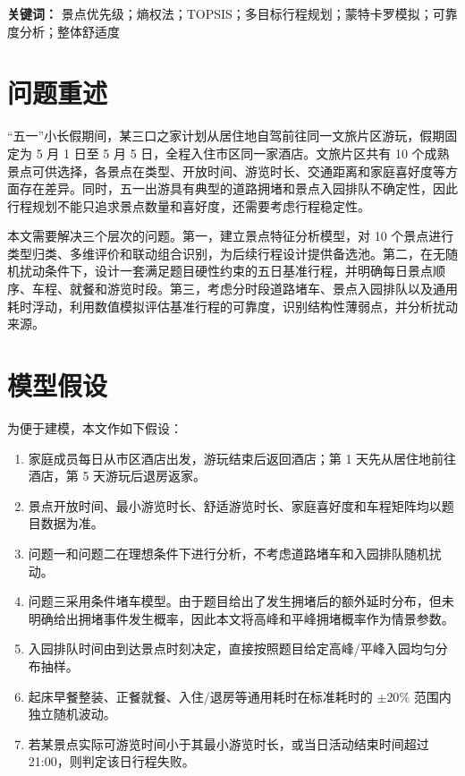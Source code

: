 \documentclass[UTF8,a4paper,12pt]{ctexart}
\begin{document}
\noindent\textbf{关键词：} 景点优先级；熵权法；TOPSIS；多目标行程规划；蒙特卡罗模拟；可靠度分析；整体舒适度

\newpage
\tableofcontents
\newpage

\section{问题重述}

“五一”小长假期间，某三口之家计划从居住地自驾前往同一文旅片区游玩，假期固定为 5 月 1 日至 5 月 5 日，全程入住市区同一家酒店。文旅片区共有 10 个成熟景点可供选择，各景点在类型、开放时间、游览时长、交通距离和家庭喜好度等方面存在差异。同时，五一出游具有典型的道路拥堵和景点入园排队不确定性，因此行程规划不能只追求景点数量和喜好度，还需要考虑行程稳定性。

本文需要解决三个层次的问题。第一，建立景点特征分析模型，对 10 个景点进行类型归类、多维评价和联动组合识别，为后续行程设计提供备选池。第二，在无随机扰动条件下，设计一套满足题目硬性约束的五日基准行程，并明确每日景点顺序、车程、就餐和游览时段。第三，考虑分时段道路堵车、景点入园排队以及通用耗时浮动，利用数值模拟评估基准行程的可靠度，识别结构性薄弱点，并分析扰动来源。

\section{模型假设}

为便于建模，本文作如下假设：
\begin{enumerate}[label=(\arabic*)]
    \item 家庭成员每日从市区酒店出发，游玩结束后返回酒店；第 1 天先从居住地前往酒店，第 5 天游玩后退房返家。
    \item 景点开放时间、最小游览时长、舒适游览时长、家庭喜好度和车程矩阵均以题目数据为准。
    \item 问题一和问题二在理想条件下进行分析，不考虑道路堵车和入园排队随机扰动。
    \item 问题三采用条件堵车模型。由于题目给出了发生拥堵后的额外延时分布，但未明确给出拥堵事件发生概率，因此本文将高峰和平峰拥堵概率作为情景参数。
    \item 入园排队时间由到达景点时刻决定，直接按照题目给定高峰/平峰入园均匀分布抽样。
    \item 起床早餐整装、正餐就餐、入住/退房等通用耗时在标准耗时的 $\pm20\%$ 范围内独立随机波动。
    \item 若某景点实际可游览时间小于其最小游览时长，或当日活动结束时间超过 21:00，则判定该日行程失败。
\end{enumerate}
\end{document}
